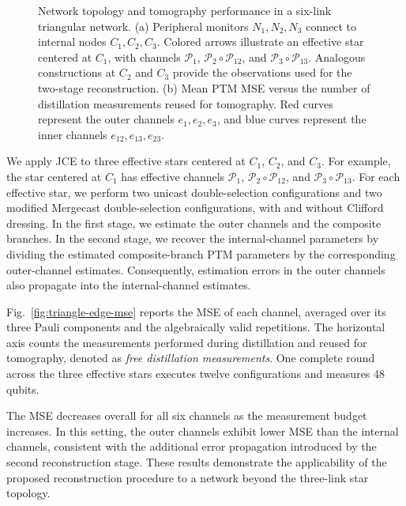 \begin{figure}[tb]
\caption{Network topology and tomography performance in a six-link
triangular network.
(a) Peripheral monitors $N_1,N_2,N_3$ connect to internal nodes
$C_1,C_2,C_3$. Colored arrows illustrate an effective star centered
at $C_1$, with channels $\mathcal P_1$,
$\mathcal P_2\circ\mathcal P_{12}$, and
$\mathcal P_3\circ\mathcal P_{13}$.
Analogous constructions at $C_2$ and $C_3$ provide the observations
used for the two-stage reconstruction.
(b) Mean PTM MSE versus the number of distillation measurements
reused for tomography. Red curves represent the outer channels
$e_1,e_2,e_3$, and blue curves represent the inner channels
$e_{12},e_{13},e_{23}$.}
\label{fig:triangle-network-results}
\end{figure}
We apply JCE to three effective stars centered at
$C_1$, $C_2$, and $C_3$.
For example, the star centered at $C_1$ has effective
channels $\mathcal P_1$, $\mathcal P_2\circ\mathcal P_{12}$,
and $\mathcal P_3\circ\mathcal P_{13}$.
For each effective star, we perform two unicast
double-selection configurations and two modified
Mergecast double-selection configurations, with and
without Clifford dressing.
In the first stage, we estimate the outer channels
and the composite branches.
In the second stage, we recover the internal-channel
parameters by dividing the estimated composite-branch
PTM parameters by the corresponding outer-channel
estimates.
Consequently, estimation errors in the outer channels
also propagate into the internal-channel estimates.

Fig.~\ref{fig:triangle-edge-mse} reports the MSE of
each channel, averaged over its three Pauli components
and the algebraically valid repetitions.
The horizontal axis counts the measurements performed
during distillation and reused for tomography,
denoted as \emph{free distillation measurements}.
One complete round across the three effective stars
executes twelve configurations and measures
48 qubits.

The MSE decreases overall for all six channels as the
measurement budget increases.
In this setting, the outer channels exhibit lower
MSE than the internal channels, consistent with
the additional error propagation introduced by
the second reconstruction stage.
These results demonstrate the applicability of
the proposed reconstruction procedure to a network
beyond the three-link star topology.










